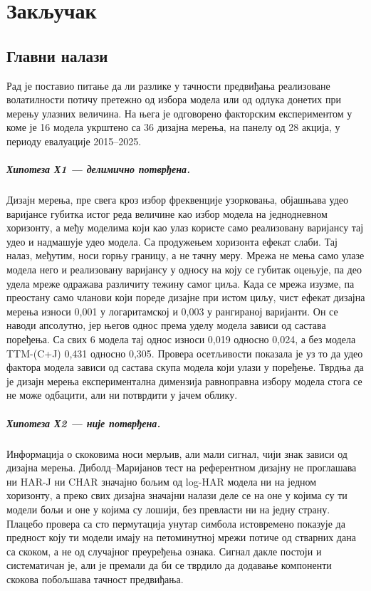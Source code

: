 \chapter{Закључак}
\label{ch:zakljucak}

\section{Главни налази}

Рад је поставио питање да ли разлике у тачности предвиђања реализоване волатилности
потичу претежно од избора модела или од одлука донетих при мерењу улазних величина. На
њега је одговорено факторским експериментом у коме је 16 модела укрштено са
36 дизајна мерења, на панелу од 28 акција, у периоду евалуације
2015–2025.

\paragraph{Хипотеза Х1 — делимично потврђена.}
Дизајн мерења, пре свега кроз избор фреквенције узорковања, објашњава удео варијансе
губитка истог реда величине као избор модела на једнодневном хоризонту, а међу моделима
који као улаз користе само реализовану варијансу тај удео и надмашује удео модела. Са
продужењем хоризонта ефекат слаби. Тај налаз, међутим, носи горњу границу, а не тачну
меру. Мрежа не мења само улазе модела него и реализовану варијансу у односу на коју се
губитак оцењује, па део удела мреже одражава различиту тежину самог циља. Када се мрежа
изузме, па преостану само чланови који пореде дизајне при истом циљу, чист ефекат дизајна
мерења износи 0,001 у логаритамској и 0,003 у рангираној варијанти. Он се наводи
апсолутно, јер његов однос према уделу модела зависи од састава поређења. Са свих 6
модела тај однос износи 0,019 односно 0,024, а без модела TTM-(C+J) 0,431 односно
0,305. Провера осетљивости
показала је уз то да удео фактора модела зависи од састава скупа модела који улази у
поређење. Тврдња да је дизајн мерења експериментална димензија равноправна избору модела
стога се не може одбацити, али ни потврдити у јачем облику.

\paragraph{Хипотеза Х2 — није потврђена.}
Информација о скоковима носи мерљив, али мали сигнал, чији знак зависи од дизајна
мерења. Диболд–Маријанов тест на референтном дизајну не проглашава ни HAR-J ни CHAR
значајно бољим од log-HAR модела ни на једном хоризонту, а преко свих дизајна значајни
налази деле се на оне у којима су ти модели бољи и оне у којима су лошији, без превласти
ни на једну страну. Плацебо провера са сто пермутација унутар симбола истовремено
показује да предност коју ти модели имају на петоминутној мрежи потиче од стварних дана
са скоком, а не од случајног преуређења ознака. Сигнал дакле постоји и систематичан је,
али је премали да би се тврдило да додавање компоненти скокова побољшава тачност
предвиђања.

